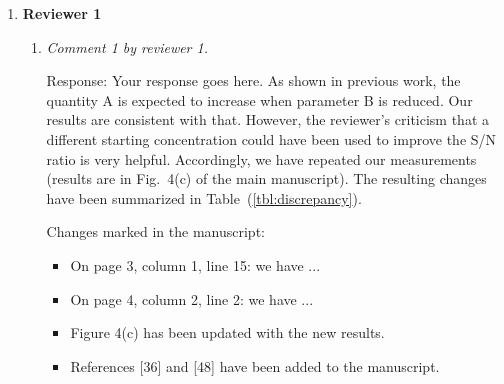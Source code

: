 \documentclass[12pt]{article}
\begin{document}
\begin{enumerate}
\item \textbf{Reviewer 1} %
  \begin{enumerate}
  \item \textit{Comment 1 by reviewer 1.}
    
    Response: Your response goes here. As shown in previous work\cite{goossens:1994}, the quantity A is expected to increase when parameter B is reduced. Our results are consistent with that. However, the reviewer's criticism that a different starting concentration could have been used to improve the S/N ratio is very helpful. Accordingly, we have repeated our measurements (results are in Fig.~4(c) of the main manuscript). The resulting changes have been summarized in Table~(\ref{tbl:discrepancy}).

    \begin{table}[!ht]
      \centering
      \caption{Summary of discrepancy from earlier submitted results. This table should not be in the main manuscript.}
      \label{tbl:discrepancy}
    \end{table}
    
    Changes marked in the manuscript:
    
    \begin{itemize}
    \item On page 3, column 1, line 15: we have ...
    \item On page 4, column 2, line 2: we have ...
    \item Figure 4(c) has been updated with the new results.
    \item References [36] and [48] have been added to the manuscript.
    \end{itemize}
    

\end{enumerate}
\end{enumerate}
\end{document}
